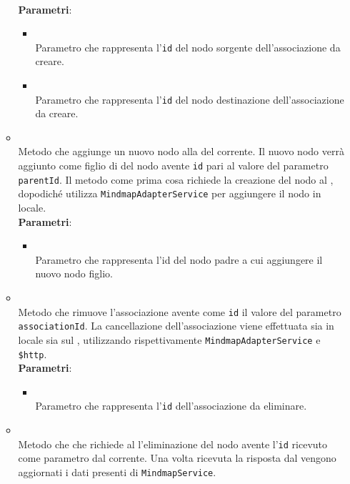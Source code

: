\begin{itemize}
\begin{itemize}
\\ \textbf{Parametri}:
\begin{itemize}
\item {}
\\ Parametro che rappresenta l'\texttt{id} del nodo sorgente dell'associazione da creare.
\item {}
\\ Parametro che rappresenta l'\texttt{id} del nodo destinazione dell'associazione da creare.
\end{itemize}
\item {}
\\ Metodo che aggiunge un nuovo nodo alla  del  corrente.
Il nuovo nodo verrà aggiunto come figlio di del nodo avente \texttt{id} pari al valore del parametro \texttt{parentId}. Il metodo come prima cosa richiede la creazione del nodo al , dopodiché utilizza \texttt{MindmapAdapterService} per aggiungere il nodo in locale.
\\ \textbf{Parametri}:
\begin{itemize}
\item {}
\\ Parametro che rappresenta l'id del nodo padre a cui aggiungere il nuovo nodo figlio.
\end{itemize}
\item {}
\\ Metodo che rimuove l'associazione avente come \texttt{id} il valore del parametro \texttt{associationId}. La cancellazione dell'associazione viene effettuata sia in locale sia sul , utilizzando rispettivamente \texttt{MindmapAdapterService} e \texttt{\$http}. \dpReturnPromiseNoValue
\\ \textbf{Parametri}:
\begin{itemize}
\item {}
\\ Parametro che rappresenta l'\texttt{id} dell'associazione da eliminare.
\end{itemize}
\item {}
\\ Metodo che che richiede al  l'eliminazione del nodo avente l'\texttt{id} ricevuto come parametro dal  corrente. Una volta ricevuta la risposta \texttt{} dal  vengono aggiornati i dati presenti di \texttt{MindmapService}.

\end{itemize}
\end{itemize}
